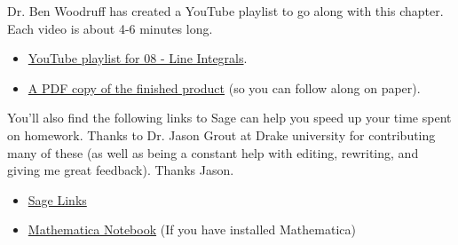 Dr. Ben Woodruff has created a YouTube playlist to go along with this chapter. Each video is about 4-6 minutes long.
\begin{itemize}
 \item \href{http://www.youtube.com/playlist?list=PL04DF68E73B7ECD54}{YouTube playlist for 08 - Line Integrals}.
 \item \href{http://db.tt/dAFBcMB7}{A PDF copy of the finished product} (so you can follow along on paper).
\end{itemize}
You'll also find the following links to Sage can help you speed up your time spent on homework. Thanks to Dr. Jason Grout at Drake university for contributing many of these (as well as being a constant help with editing, rewriting, and giving me great feedback).  Thanks Jason. 
\begin{itemize}
 \item \href{http://bmw.byuimath.com/dokuwiki/doku.php?id=sage_links}{Sage Links}
 \item \href{https://content.byui.edu/file/3e8d885f-db47-4e74-9e04-c3d72627c835/1/_zips/215-Tech-Introduction.zip}{Mathematica Notebook} (If you have installed Mathematica)
\end{itemize}






